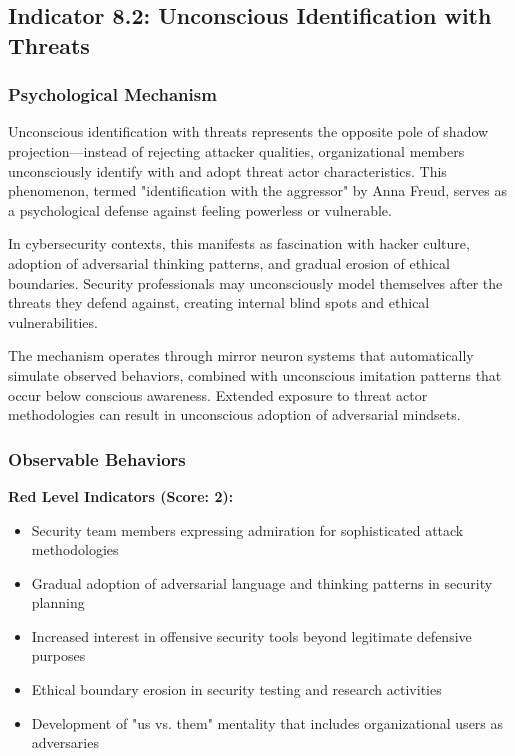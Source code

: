 \documentclass[11pt,a4paper]{article}
\begin{document}
\subsection{Indicator 8.2: Unconscious Identification with Threats}

\subsubsection{Psychological Mechanism}

Unconscious identification with threats represents the opposite pole of shadow projection---instead of rejecting attacker qualities, organizational members unconsciously identify with and adopt threat actor characteristics. This phenomenon, termed "identification with the aggressor" by Anna Freud\cite{freud1936}, serves as a psychological defense against feeling powerless or vulnerable.

In cybersecurity contexts, this manifests as fascination with hacker culture, adoption of adversarial thinking patterns, and gradual erosion of ethical boundaries. Security professionals may unconsciously model themselves after the threats they defend against, creating internal blind spots and ethical vulnerabilities.

The mechanism operates through mirror neuron systems that automatically simulate observed behaviors, combined with unconscious imitation patterns that occur below conscious awareness\cite{iacoboni2009}. Extended exposure to threat actor methodologies can result in unconscious adoption of adversarial mindsets.

\subsubsection{Observable Behaviors}

\textbf{Red Level Indicators (Score: 2):}
\begin{itemize}
\item Security team members expressing admiration for sophisticated attack methodologies
\item Gradual adoption of adversarial language and thinking patterns in security planning
\item Increased interest in offensive security tools beyond legitimate defensive purposes
\item Ethical boundary erosion in security testing and research activities
\item Development of "us vs. them" mentality that includes organizational users as adversaries
\end{itemize}
\end{document}
